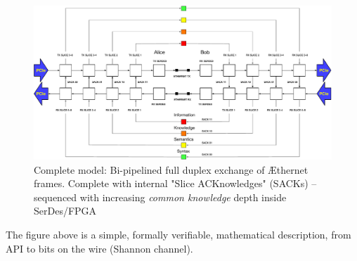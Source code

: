 \begin{figure}
\includegraphics[width=\textwidth]{./figures/Full-Duplex-Bi-Pipelined.pdf}
  \caption{Complete model: Bi-pipelined full duplex exchange of  Æthernet frames. Complete with internal "Slice ACKnowledges" (SACKs) -- sequenced with increasing \emph{common knowledge} depth inside SerDes/FPGA}
\end{figure}

The figure above is a simple, formally verifiable, mathematical description, from API to bits on the wire (Shannon channel). 

